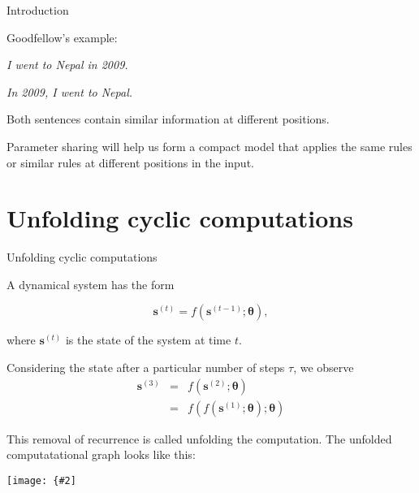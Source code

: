\documentclass{beamer}
\renewcommand{\vec}[1]{\boldsymbol{#1}}
\newcommand{\myfig}[3]{\centerline{\texttt{[image: \{\#2]}}}
    \centerline{\scriptsize #3}}
\begin{document}
\begin{frame}{Introduction}

  Goodfellow's example:

  \medskip
  
  \textit{I went to Nepal in 2009.}

  \textit{In 2009, I went to Nepal.}

  \medskip

  Both sentences contain similar information at different
  positions.

  \medskip

  Parameter sharing will help us form a compact model that applies the
  same rules or similar rules at different positions in the input.
  
\end{frame}

\section{Unfolding cyclic computations}

\begin{frame}{Unfolding cyclic computations}

  A \alert{dynamical system} has the form
  
  \[ \vec{s}^{(t)} = f(\vec{s}^{(t-1)};\vec{\theta}), \] 

  where $\vec{s}^{(t)}$ is the \alert{state} of the system at time $t$.

  \medskip
  
  Considering the state after a particular number of steps $\tau$,
  we observe
  \begin{eqnarray}
    \vec{s}^{(3)} & = & f(\vec{s}^{(2)};\vec{\theta}) \nonumber \\
    & = & f(f(\vec{s}^{(1)};\vec{\theta});\vec{\theta}) \nonumber
  \end{eqnarray}

  This removal of recurrence is called \alert{unfolding} the computation.
  The unfolded computatational graph looks like this:

  \medskip
  
  \myfig{3in}{goodfellow-fig10-01}{Goodfellow, Bengio, and Courville (2016), Fig.\ 10.1}
  
\end{frame}
\end{document}

